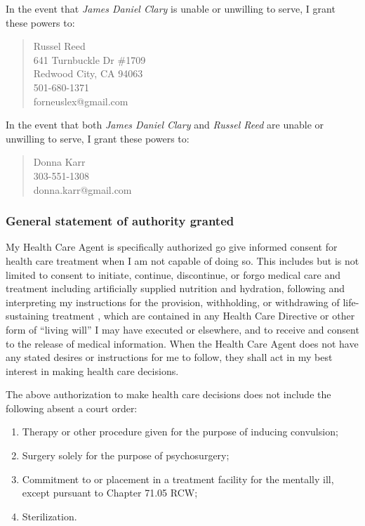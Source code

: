 \documentclass[oneside]{memoir}
\begin{document}
\vspace{1ex}

\noindent In the event that \emph{James Daniel Clary} is unable or unwilling to serve, I grant these powers to:

\begin{quote}
    Russel Reed\\
    641 Turnbuckle Dr \#1709\\
    Redwood City, CA 94063\\
    501-680-1371\\
    forneuslex@gmail.com
\end{quote}

\noindent In the event that both \emph{James Daniel Clary} and \emph{Russel Reed} are unable or unwilling to serve, I grant these powers to:

\begin{quote}
    Donna Karr\\
    303-551-1308\\
    donna.karr@gmail.com
\end{quote}

\subsubsection{General statement of authority granted}\label{general-statement-of-authority-granted}

My Health Care Agent is specifically authorized go give informed consent for health care treatment when I am not capable of doing so. This includes but is not limited to consent to initiate, continue, discontinue, or forgo medical care and treatment including artificially supplied nutrition and hydration, following and interpreting my instructions for the provision, withholding, or withdrawing of life-sustaining treatment , which are contained in any Health Care Directive or other form of ``living will'' I may have executed or elsewhere, and to receive and consent to the release of medical information. When the Health Care Agent does not have any stated desires or instructions for me to follow, they shall act in my best interest in making health care decisions.

\newpage

\noindent The above authorization to make health care decisions does not include the following absent a court order:

\begin{enumerate}
\def\labelenumi{\arabic{enumi}.}
\tightlist
\item
  Therapy or other procedure given for the purpose of inducing convulsion;
\item
  Surgery solely for the purpose of psychosurgery;
\item
  Commitment to or placement in a treatment facility for the mentally ill, except pursuant to Chapter 71.05 RCW;
\item
  Sterilization.
\end{enumerate}
\end{document}

